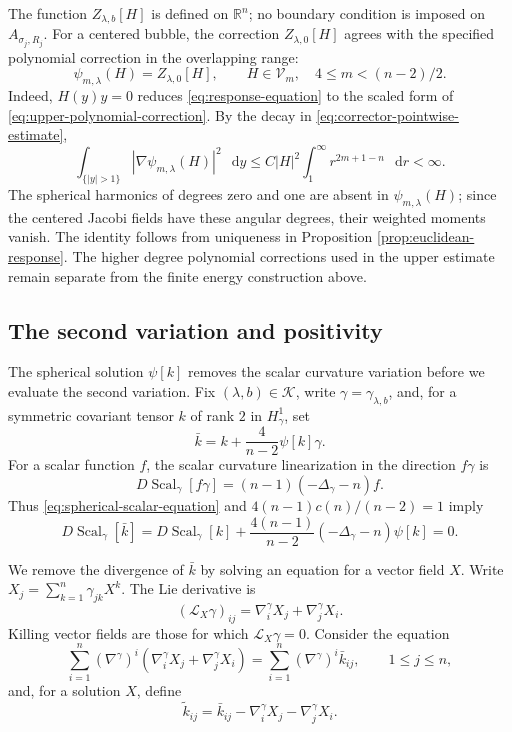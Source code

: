 \documentclass[11pt]{article}
\numberwithin{equation}{section}
\theoremstyle{remark}
\newcommand{\R}{\mathbb R}
\newcommand{\dd}{\mathop{}\!\mathrm{d}}
\begin{document}
The function \(Z_{\lambda,b}[H]\) is defined on \(\R^n\);
no boundary condition is imposed on \(A_{\sigma_j,R_j}\).
For a centered bubble, the correction \(Z_{\lambda,0}[H]\) agrees with the specified
polynomial correction in the overlapping range:
 {
\[
 \psi_{m,\lambda}(H)=Z_{\lambda,0}[H],
 \qquad H\in\mathcal V_m,\quad 4\le m<(n-2)/2.
\]
}
Indeed, \(H(y)y=0\) reduces \eqref{eq:response-equation} to
the scaled form of \eqref{eq:upper-polynomial-correction}. By the decay in \eqref{eq:corrector-pointwise-estimate},
{
\[
 \int_{\{|y|>1\}}|\nabla\psi_{m,\lambda}(H)|^2\,\dd y
 \le C|H|^2\int_1^\infty r^{2m+1-n}\,\dd r<\infty.
\]
}
The spherical harmonics of degrees zero and one are absent in
 \(\psi_{m,\lambda}(H)\); since the centered Jacobi fields have these
angular degrees, their weighted moments vanish.
{The identity follows from uniqueness in
Proposition  \ref{prop:euclidean-response}.} The
higher degree polynomial corrections used in the upper estimate remain
separate from the finite energy construction above.

\subsection{The second variation and positivity}

{The spherical solution \(\psi[k]\) removes the scalar curvature
variation before we evaluate the second variation.}
Fix \((\lambda,b)\in\mathcal K\), write \(\gamma=\gamma_{\lambda,b}\),
and, for a symmetric covariant tensor \(k\) of rank \(2\) in
\(H^1_\gamma\), set
\begin{equation}\label{eq:scalar-corrected-metric}
 \bar k=k+\frac4{n-2}\psi[k]\gamma.
\end{equation}
{For a scalar function \(f\), the scalar curvature linearization
in the direction \(f\gamma\) is}
\[
 D\!\operatorname{Scal}_\gamma[f\gamma]=(n-1)(-\Delta_\gamma-n)f.
\]
Thus \eqref{eq:spherical-scalar-equation} and
\(4(n-1)c(n)/(n-2)=1\) imply
\[
 D\!\operatorname{Scal}_\gamma[\bar k]
 =D\!\operatorname{Scal}_\gamma[k]
 +\frac{4(n-1)}{n-2}(-\Delta_\gamma-n)\psi[k]=0.
\]

We remove the divergence of \(\bar k\) by solving an equation for a vector
field \(X\). Write \(X_j=\sum_{k=1}^n\gamma_{jk}X^k\). The Lie derivative is
\[
 (\mathcal L_X\gamma)_{ij}=\nabla^\gamma_iX_j+\nabla^\gamma_jX_i.
\]
Killing vector fields are those for which \(\mathcal L_X\gamma=0\).
Consider the equation
\begin{equation}\label{eq:divergence-correction-equation}
 \sum_{i=1}^n(\nabla^\gamma)^i
   (\nabla^\gamma_iX_j+\nabla^\gamma_jX_i)
 =\sum_{i=1}^n(\nabla^\gamma)^i\bar k_{ij},
 \qquad 1\le j\le n,
\end{equation}
and, for a solution \(X\), define
\begin{equation}\label{eq:corrected-divergence-free-tensor}
\widetilde k_{ij}
=\bar k_{ij}-\nabla^\gamma_iX_j-\nabla^\gamma_jX_i.
\end{equation}
\end{document}
